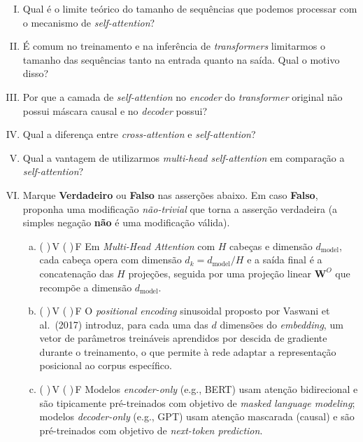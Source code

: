 \documentclass{dlproblemset}
\begin{document}
\begin{enumerate}[I)]
    \item Qual é o limite teórico do tamanho de sequências que podemos processar com o mecanismo de \textit{self-attention}?

    \item É comum no treinamento e na inferência de \textit{transformers} limitarmos o tamanho das sequências tanto na entrada quanto na saída.
    Qual o motivo disso?

    \item Por que a camada de \textit{self-attention} no \textit{encoder} do \textit{transformer} original não possui máscara causal e no \textit{decoder} possui?

    \item Qual a diferença entre \textit{cross-attention} e \textit{self-attention}?

    \item Qual a vantagem de utilizarmos \textit{multi-head self-attention} em comparação a \textit{self-attention}?


    \item Marque \textbf{Verdadeiro} ou \textbf{Falso} nas asserções abaixo. Em caso \textbf{Falso}, proponha uma modificação \emph{não-trivial} que torna a asserção verdadeira (a simples negação \textbf{não} é uma modificação válida).

    \begin{enumerate}[a)]
        \item ( )\,V \quad ( )\,F \quad Em \textit{Multi-Head Attention} com $H$ cabeças e dimensão $d_\text{model}$, cada cabeça opera com dimensão $d_k = d_\text{model}/H$ e a saída final é a concatenação das $H$ projeções, seguida por uma projeção linear $\mathbf{W}^O$ que recompõe a dimensão $d_\text{model}$.

        \item ( )\,V \quad ( )\,F \quad O \textit{positional encoding} sinusoidal proposto por Vaswani et al.\ (2017) introduz, para cada uma das $d$ dimensões do \textit{embedding}, um vetor de parâmetros treináveis aprendidos por descida de gradiente durante o treinamento, o que permite à rede adaptar a representação posicional ao corpus específico.

        \item ( )\,V \quad ( )\,F \quad Modelos \textit{encoder-only} (e.g., BERT) usam atenção bidirecional e são tipicamente pré-treinados com objetivo de \textit{masked language modeling}; modelos \textit{decoder-only} (e.g., GPT) usam atenção mascarada (causal) e são pré-treinados com objetivo de \textit{next-token prediction}.


\end{enumerate}
\end{enumerate}
\end{document}
